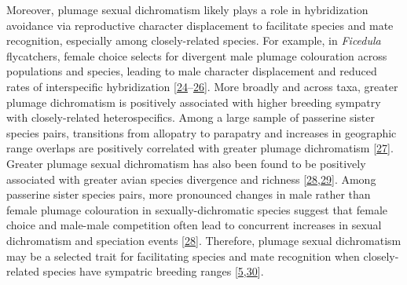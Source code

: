 \documentclass[
  a4paper,
]{article}
\begin{document}
Moreover, plumage sexual dichromatism likely plays a role in
hybridization avoidance via reproductive character displacement to
facilitate species and mate recognition, especially among
closely-related species. For example, in \emph{Ficedula} flycatchers,
female choice selects for divergent male plumage colouration across
populations and species, leading to male character displacement and
reduced rates of interspecific hybridization
{[}\protect\hyperlink{ref-alatalo1994}{24}--\protect\hyperlink{ref-laaksonen2015}{26}{]}.
More broadly and across taxa, greater plumage dichromatism is positively
associated with higher breeding sympatry with closely-related
heterospecifics. Among a large sample of passerine sister species pairs,
transitions from allopatry to parapatry and increases in geographic
range overlaps are positively correlated with greater plumage
dichromatism {[}\protect\hyperlink{ref-cooney2017}{27}{]}. Greater
plumage sexual dichromatism has also been found to be positively
associated with greater avian species divergence and richness
{[}\protect\hyperlink{ref-seddon2013}{28},\protect\hyperlink{ref-cooney2019}{29}{]}.
Among passerine sister species pairs, more pronounced changes in male
rather than female plumage colouration in sexually-dichromatic species
suggest that female choice and male-male competition often lead to
concurrent increases in sexual dichromatism and speciation events
{[}\protect\hyperlink{ref-seddon2013}{28}{]}. Therefore, plumage sexual
dichromatism may be a selected trait for facilitating species and mate
recognition when closely-related species have sympatric breeding ranges
{[}\protect\hyperlink{ref-martin2015a}{5},\protect\hyperlink{ref-martin2010}{30}{]}.
\end{document}
